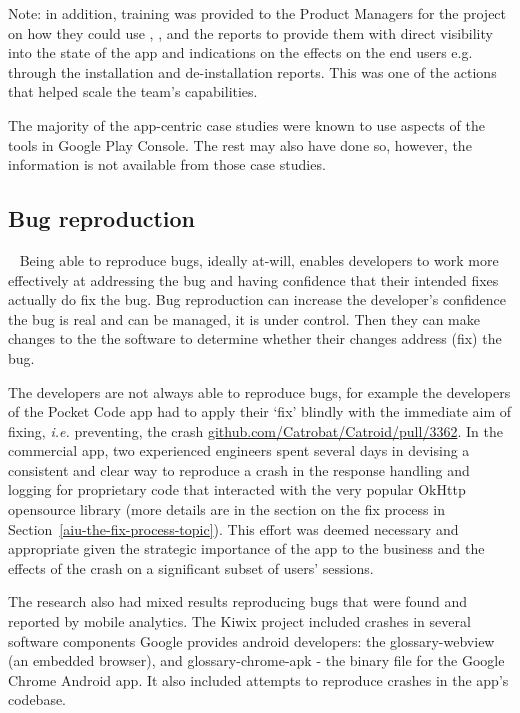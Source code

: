 Note: in addition, training was provided to the Product Managers for the project on how they could use , , and the  reports to provide them with direct visibility into the state of the app and indications on the effects on the end users e.g. through the installation and de-installation reports. This was one of the actions that helped scale the team's capabilities.

The majority of the app-centric case studies were known to use aspects of the  tools in Google Play Console. The rest may also have done so, however, the information is not available from those case studies.


\subsection{Bug reproduction}~\label{aiu-bug-reproduction-topic}
Being able to reproduce bugs, ideally at-will, enables developers to work more effectively at addressing the bug and having confidence that their intended fixes actually do fix the bug. 
Bug reproduction can increase the developer's confidence the bug is real and can be managed, it is under control. Then they can make changes to the the software to determine whether their changes address (fix) the bug. 

The developers are not always able to reproduce bugs, for example the developers of the Pocket Code app had to apply their `fix' blindly with the immediate aim of fixing, \emph{i.e.} preventing, the crash \href{https://github.com/Catrobat/Catroid/pull/3362}{github.com/Catrobat/Catroid/pull/3362}.  In the commercial app, two experienced engineers spent several days in devising a consistent and clear way to reproduce a crash in the response handling and logging for proprietary code that interacted with the very popular OkHttp opensource library (more details are in the section on the fix process in Section~\ref{aiu-the-fix-process-topic}). This effort was deemed necessary and appropriate given the strategic importance of the app to the business and the effects of the crash on a significant subset of users' sessions.

The research also had mixed results reproducing bugs that were found and reported by mobile analytics.
%
The Kiwix project included crashes in several software components Google provides android developers: the \Gls{glossary-webview} (an embedded browser), and \Gls{glossary-chrome-apk} - the binary file for the Google Chrome Android app. It also included attempts to reproduce crashes in the app's codebase. 

